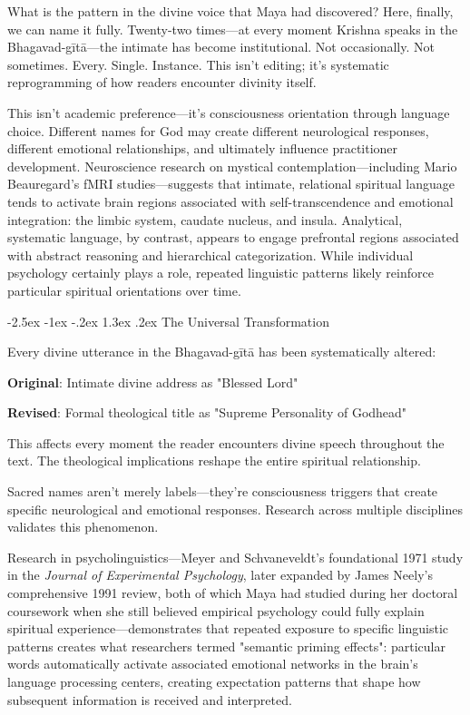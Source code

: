 \documentclass[12pt,twoside]{book}
\makeatletter
\renewcommand\section{\@startsection{section}{1}{\z@}%
{-2.5ex \@plus -1ex \@minus -.2ex}%
{1.3ex \@plus.2ex}%
{\normalfont\Large\bfseries}}
\makeatother
\begin{document}
\normalfont\justifying
What is the pattern in the divine voice that Maya had discovered? Here, finally, we can name it fully. Twenty-two times—at every moment Krishna speaks in the Bhagavad-gītā—the intimate has become institutional. Not occasionally. Not sometimes. Every. Single. Instance. This isn't editing; it's systematic reprogramming of how readers encounter divinity itself.

This isn't academic preference—it's consciousness orientation through language choice. Different names for God may create different neurological responses, different emotional relationships, and ultimately influence practitioner development. Neuroscience research on mystical contemplation—including Mario Beauregard's fMRI studies—suggests that intimate, relational spiritual language tends to activate brain regions associated with self-transcendence and emotional integration: the limbic system, caudate nucleus, and insula. Analytical, systematic language, by contrast, appears to engage prefrontal regions associated with abstract reasoning and hierarchical categorization. While individual psychology certainly plays a role, repeated linguistic patterns likely reinforce particular spiritual orientations over time.

\vspace{-0.5cm}
\section{The Universal Transformation}
\label{sec:orgff3890f}

Every divine utterance in the Bhagavad-gītā has been systematically altered:

\textbf{\textbf{Original}}: Intimate divine address as "Blessed Lord"

\textbf{\textbf{Revised}}: Formal theological title as "Supreme Personality of Godhead"

This affects every moment the reader encounters divine speech throughout the text. The theological implications reshape the entire spiritual relationship.


Sacred names aren't merely labels—they're consciousness triggers that create specific neurological and emotional responses. Research across multiple disciplines validates this phenomenon.

Research in psycholinguistics—Meyer and Schvaneveldt's foundational 1971 study in the \emph{Journal of Experimental Psychology}, later expanded by James Neely's comprehensive 1991 review, both of which Maya had studied during her doctoral coursework when she still believed empirical psychology could fully explain spiritual experience—demonstrates that repeated exposure to specific linguistic patterns creates what researchers termed "semantic priming effects": particular words automatically activate associated emotional networks in the brain's language processing centers, creating expectation patterns that shape how subsequent information is received and interpreted.
\end{document}
